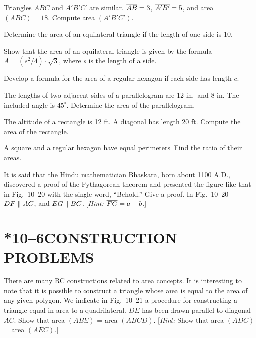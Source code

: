 \documentclass[11pt]{book}
\begin{document}
\begin{exercisecols}
\begin{exlist}
\item Triangles $ABC$ and $A'B'C'$ are similar. $\overline{AB} = 3$,
  $\overline{A'B'} = 5$, and area $(ABC) = 18$. Compute area $(A'B'C')$.
\item Determine the area of an equilateral triangle if the length of one side
  is 10.
\item Show that the area of an equilateral triangle is given by the formula
  $A = (s^2/4) \cdot \sqrt{3}$, where $s$ is the length of a side.
\item Develop a formula for the area of a regular hexagon if each side has
  length $c$.
\item The lengths of two adjacent sides of a parallelogram are 12 in.\ and
  8 in. The included angle is $45^\circ$. Determine the area of the
  parallelogram.
\item The altitude of a rectangle is 12 ft. A diagonal has length 20 ft.
  Compute the area of the rectangle.
\item[\stex 7.] A square and a regular hexagon have equal perimeters. Find the
  ratio of their areas.
\item[\stex 8.] It is said that the Hindu mathematician Bhaskara, born about
  1100 A.D., discovered a proof of the Pythagorean theorem and presented the
  figure like that in Fig.~10--20 with the single word, ``Behold.'' Give a
  proof. In Fig.~10--20 $DF \mathrel{\|} AC$, and $EG \mathrel{\|} BC$.
  [\emph{Hint:} $\overline{FC} = a - b$.]
\exfig{\FIGXTWENTY}
\end{exlist}
\end{exercisecols}

\section*{*10--6\quad CONSTRUCTION PROBLEMS}

There are many RC constructions related to area concepts. It is interesting to
note that it is possible to construct a triangle whose area is equal to the
area of any given polygon. We indicate in Fig.~10--21 a procedure for
constructing a triangle equal in area to a quadrilateral. $DE$ has been drawn
parallel to diagonal $AC$. Show that area $(ABE)$ = area $(ABCD)$.
[\emph{Hint:} Show that area $(ADC)$ = area $(AEC)$.]
\end{document}
